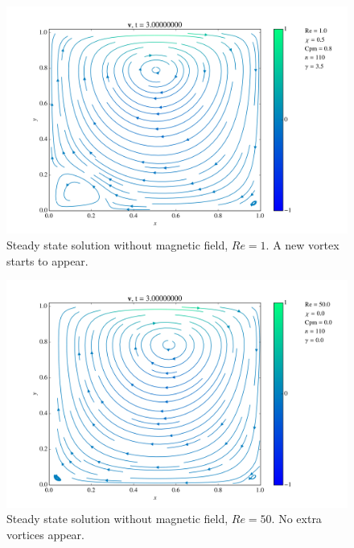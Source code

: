\documentclass[journal]{IEEEtran}
\begin{document}
\begin{figure}[!t]
\centering
\includegraphics[width=\linewidth]{figures/Re001/w/vectorField}
\caption{Steady state solution without magnetic field, $\mathit{Re}=1$. A new vortex starts to appear. \label{Re001wVectorField}}
\end{figure}

\begin{figure}[!t]
\centering
\includegraphics[width=\linewidth]{figures/Re050/n/vectorField}
\caption{Steady state solution without magnetic field, $\mathit{Re}=50$. No extra vortices appear. \label{Re050nVectorField}}
\end{figure}
\end{document}

